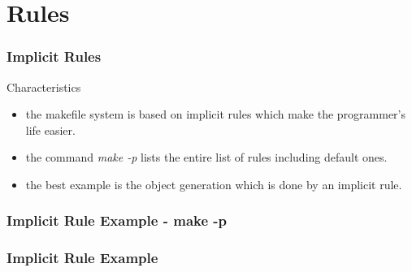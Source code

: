 \documentclass{beamer}
\begin{document}
%
%

\section{Rules}


\begin{frame}
  \frametitle{Implicit Rules}

  \begin{block}{Characteristics}
    \begin{itemize}
      \item<1->
        the makefile system is based on implicit rules which make the
        programmer's life easier.
      \item<1->
        the command \textit{make -p} lists the entire list of rules including
        default ones.
      \item<1->
        the best example is the object generation which is done by an implicit
        rule.
    \end{itemize}
  \end{block}

\end{frame}


\begin{frame}
  \frametitle{Implicit Rule Example - {\small make -p}}

  \begin{Example}
    
  \end{Example}

  \begin{Example}
    
  \end{Example}

\end{frame}


\begin{frame}
  \frametitle{Implicit Rule Example}

  \begin{Example}
    
  \end{Example}

\end{frame}

\end{document}
